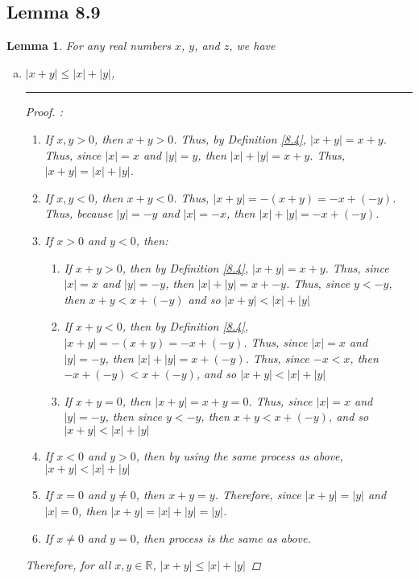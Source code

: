 \documentclass[openany, amssymb, psamsfonts]{amsart}
\newcommand{\bbR}{\mathbb{R}}
\newcommand{\abs}[1]{\lvert #1 \rvert}
\newtheorem{lem}{Lemma}[section]
\theoremstyle{definition}
\numberwithin{equation}{section}
\begin{document}
\subsection*{Lemma 8.9}
\begin{lem}
	For any real numbers $x$, $y$, and $z$, we have 
		\begin{enumerate}[(a)]
		\item \quad $\abs{x + y} \leq \abs{x} + \abs{y}$,
\vspace{4pt}     \hrule   \vspace{4pt}
\begin{proof} :\\
\begin{enumerate}
    \item If $x,y>0$, then $x+y>0$. Thus, by Definition \ref{8.4}, $\abs{x+y}= x+y$. Thus, since $\abs{x} = x$ and $\abs{y}=y$, then $\abs{x}+\abs{y} = x+y$. Thus, $\abs{x+y}=\abs{x}+\abs{y}$.
    \item If $x,y<0$, then $x+y <0$. Thus, $\abs{x+y} = -(x+y) = -x+(-y)$. Thus, because $|y| = -y$ and $|x| = -x$, then $|x|+|y| = -x + (-y)$.
    \item If $x>0$ and $y<0$, then:
    \begin{enumerate}
        \item If $x+y>0$, then by Definition \ref{8.4}, $\abs{x+y}= x+y$. Thus, since $\abs{x} = x$ and $\abs{y}=-y$, then $\abs{x}+\abs{y} = x+-y$. Thus, since $y<-y$, then $x+y<x+(-y)$ and so $\abs{x+y} < \abs{x} + \abs{y}$
        \item If $x+y<0$, then by Definition \ref{8.4}, $\abs{x+y}= -(x+y)=-x+(-y)$. Thus, since $\abs{x} = x$ and $\abs{y}=-y$, then $\abs{x}+\abs{y} = x+(-y)$. Thus, since $-x<x$, then $-x+(-y)<x+(-y)$, and so $\abs{x+y} < \abs{x} + \abs{y}$
        \item If $x+y = 0$, then $\abs{x+y} = x+y = 0$. Thus, since $\abs{x}=x$ and $\abs{y}=-y$, then since $y<-y$, then $x+y < x+ (-y)$, and so $\abs{x+y} < \abs{x} + \abs{y}$
    \end{enumerate}
    \item If $x<0$ and $y>0$, then by using the same process as above, $\abs{x+y}<\abs{x}+\abs{y}$
    \item If $x=0$ and $y\neq 0$, then $x+y = y$. Therefore, since $\abs{x+y} = \abs{y}$ and $\abs{x}=0$, then $\abs{x+y} = \abs{x}+\abs{y}=\abs{y}$.
    \item If $x\neq 0$ and $y=0$, then process is the same as above.
\end{enumerate}
Therefore, for all $x,y\in \bbR$, $\abs{x+y}\leq \abs{x}+\abs{y}$

\end{proof}
\end{enumerate}
\end{lem}
\end{document}
